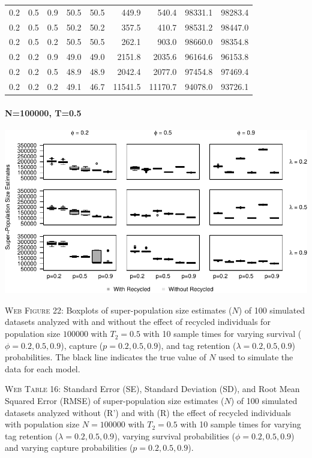 \documentclass[]{article}
\let\oldparagraph\paragraph
\renewcommand{\paragraph}[1]{\oldparagraph{#1}\mbox{}}
\begin{document}
\begin{table}[ht]
{\begin{tabular}{rrrrrrrrr}
  0.2 & 0.5 & 0.9 & 50.5 & 50.5 & 449.9 & 540.4 & 98331.1 & 98283.4 \\ 
  0.2 & 0.5 & 0.5 & 50.2 & 50.2 & 357.5 & 410.7 & 98531.2 & 98447.0 \\ 
  0.2 & 0.5 & 0.2 & 50.5 & 50.5 & 262.1 & 903.0 & 98660.0 & 98354.8 \\ 
  0.2 & 0.2 & 0.9 & 49.0 & 49.0 & 2151.8 & 2035.6 & 96164.6 & 96153.8 \\ 
  0.2 & 0.2 & 0.5 & 48.9 & 48.9 & 2042.4 & 2077.0 & 97454.8 & 97469.4 \\ 
  0.2 & 0.2 & 0.2 & 49.1 & 46.7 & 11541.5 & 11170.7 & 94078.0 & 93726.1 \\ 
   \hline
\end{tabular}
}
\endgroup
\end{table}

\newpage

\paragraph{N=100000, T=0.5}\label{n100000-t0.5-4}

\includegraphics{Appendix_BW_files/figure-latex/figure22_superN_GJSTL3-1.pdf}

\textsc{Web Figure 22:} Boxplots of super-population size estimates
(\(N\)) of 100 simulated datasets analyzed with and without the effect
of recycled individuals for population size \(100000\) with \(T_2=0.5\)
with 10 sample times for varying survival (\(\phi=0.2,0.5,0.9\)),
capture (\(p=0.2,0.5,0.9\)), and tag retention (\(\lambda=0.2,0.5,0.9\))
probabilities. The black line indicates the true value of \(N\) used to
simulate the data for each model.

\textsc{Web Table 16:} Standard Error (SE), Standard Deviation (SD), and
Root Mean Squared Error (RMSE) of super-population size estimates
(\(N\)) of 100 simulated datasets analyzed without (R') and with (R) the
effect of recycled individuals with population size \(N=100000\) with
\(T_2=0.5\) with 10 sample times for varying tag retention
(\(\lambda=0.2,0.5,0.9\)), varying survival probabilities
(\(\phi=0.2,0.5,0.9\)) and varying capture probabilities
(\(p=0.2,0.5,0.9\)).
\end{document}
